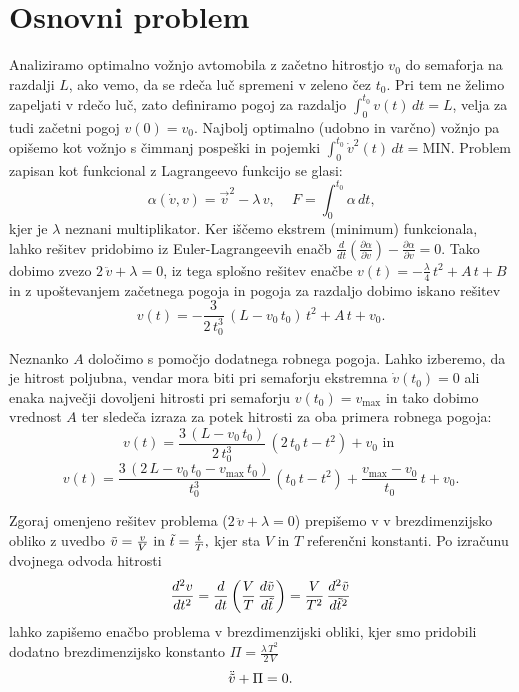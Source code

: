 \section{Osnovni problem}\label{sec:1}

Analiziramo optimalno vožnjo avtomobila z začetno hitrostjo $v_0$ do semaforja na razdalji $L$, ako vemo, da se rdeča luč spremeni v zeleno čez $t_0$. Pri tem ne želimo zapeljati v rdečo luč, zato definiramo pogoj za razdaljo $\int_0^{t_0} v(t) \, dt = L$, velja za tudi začetni pogoj $v(0) = v_0$. Najbolj optimalno (udobno in varčno) vožnjo pa opišemo kot vožnjo s čimmanj pospeški in pojemki $\int_0^{t_0} \dot{v}^2(t) \, dt = \text{MIN}$. Problem zapisan kot funkcional z Lagrangeevo funkcijo se glasi: 
$$\alpha(\dot{v}, v) = \vec{v}^2 - \lambda \, v \text{, } \quad F = \int_0^{t_0} \alpha \, dt \text{,}$$
kjer je $\lambda$ neznani multiplikator. Ker iščemo ekstrem (minimum) funkcionala, lahko rešitev pridobimo iz Euler-Lagrangeevih enačb $\frac{d}{dt} \left( \frac{\partial \alpha}{\partial \dot{v}} \right) - \frac{\partial \alpha}{\partial v} = 0$. Tako dobimo zvezo $ 2 \, \ddot{v} + \lambda =0$, iz tega splošno rešitev enačbe $v(t) = - \frac{\lambda}{4} \, t^2 + A \, t + B$ in z upoštevanjem začetnega pogoja in pogoja za razdaljo dobimo iskano rešitev
$$v(t) = - \frac{3}{2 \, t_0^3} \, (L - v_0 \, t_0) \, t^2 + A \, t + v_0 \text{.}$$

Neznanko $A$ določimo s pomočjo dodatnega robnega pogoja. Lahko izberemo, da je hitrost poljubna, vendar mora biti pri semaforju ekstremna $\dot{v}(t_0) = 0$ ali enaka največji dovoljeni hitrosti pri semaforju $v(t_0) = v_{\text{max}}$ in tako dobimo vrednost $A$ ter sledeča izraza za potek hitrosti za oba primera robnega pogoja:
$$v(t) = \frac{3 \, (L- v_0\, t_0)}{2 \, t_0^3} \, (2 \, t_0 \, t - t^2) + v_0 \text{ in }$$
$$v(t) = \frac{3 \, (2\, L - v_0\, t_0 - v_{\text{max}}\, t_0)}{t_0^3} \, (t_0 \, t - t^2) + \frac{ v_{\text{max}} - v_0}{t_0} \, t+ v_0 \text{.}$$

Zgoraj omenjeno rešitev problema ($2 \, \ddot{v} + \lambda =0$) prepišemo v v brezdimenzijsko obliko z uvedbo $\Tilde{v}= \frac{v}{V} \text{ in } \Tilde{t}= \frac{t}{T} \text{,}$ kjer sta $V$ in $T$ referenčni konstanti. Po izračunu dvojnega odvoda hitrosti
$$\frac{d^2v}{dt^2} = \frac{d}{dt} \left( \frac{V}{T} \, \frac{d\Tilde{v}}{d\Tilde{t}} \right) = \frac{V}{T^2} \, \frac{d^2\Tilde{v}}{d\Tilde{t}^2}$$
lahko zapišemo enačbo problema v brezdimenzijski obliki, kjer smo pridobili dodatno brezdimenzijsko konstanto $\Pi = \frac{\lambda \, T^2}{2 \, V}$
$$\ddot{\Tilde{v}} + \Pi = 0 \text{.}$$

